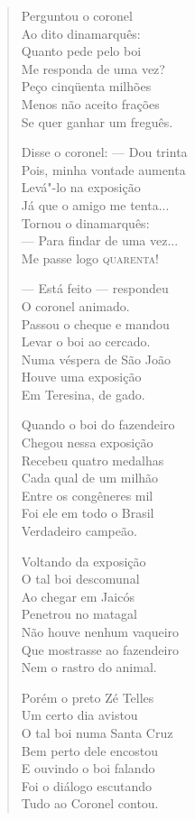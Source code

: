 \begin{verse}
Perguntou o coronel \\
Ao dito dinamarquês: \\
Quanto pede pelo boi \\
Me responda de uma vez? \\
Peço cinqüenta milhões \\
Menos não aceito frações \\
Se quer ganhar um freguês. 


Disse o coronel: ---  Dou trinta \\
Pois, minha vontade aumenta \\
Levá"-lo na exposição \\
Já que o amigo me tenta... \\
Tornou o dinamarquês: \\
---  Para findar de uma vez... \\
Me passe logo \textsc{quarenta}! 

---  Está feito ---  respondeu \\
O coronel animado. \\
Passou o cheque e mandou \\
Levar o boi ao cercado. \\
Numa véspera de São João \\
Houve uma exposição \\
Em Teresina, de gado. 

Quando o boi do fazendeiro \\
Chegou nessa exposição \\
Recebeu quatro medalhas \\
Cada qual de um milhão \\
Entre os congêneres mil \\
Foi ele em todo o Brasil \\
Verdadeiro campeão. 

Voltando da exposição \\
O tal boi descomunal \\
Ao chegar em Jaicós \\
Penetrou no matagal \\
Não houve nenhum vaqueiro \\
Que mostrasse ao fazendeiro \\
Nem o rastro do animal. 


Porém o preto Zé Telles \\
Um certo dia avistou \\
O tal boi numa Santa Cruz \\
Bem perto dele encostou \\
E ouvindo o boi falando \\
Foi o diálogo escutando \\
Tudo ao Coronel contou. 


\end{verse}
